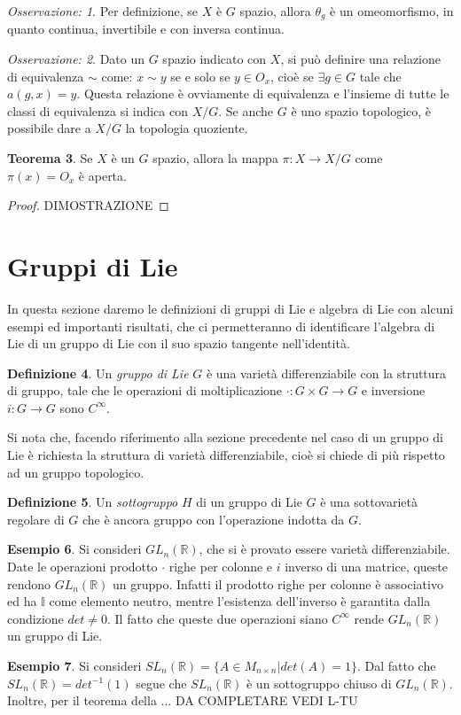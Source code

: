 \documentclass[12pt,a4paper]{report}
\theoremstyle{definition}
\newtheorem{Def}{Definizione}[chapter]
\newtheorem{Theo}[Def]{Teorema}
\theoremstyle{definition}
\newtheorem{Ex}[Def]{Esempio}
\theoremstyle{definition}
\theoremstyle{remark}
\newtheorem{Obs}[Def]{Osservazione:}
\begin{document}
\begin{Obs}
	Per definizione, se $X$ è $G$ spazio, allora $\theta_g$ è un omeomorfismo, in quanto continua, invertibile e con inversa continua.
\end{Obs}
\begin{Obs}
	Dato un $G$ spazio indicato con $X$, si può definire una relazione di equivalenza $\sim$ come: $x\sim y$ se e solo se $y\in O_x$, cioè se $\exists g\in G$ tale che $a(g,x)=y$. Questa relazione è ovviamente di equivalenza e l'insieme di tutte le classi di equivalenza si indica con $X/G$. Se anche $G$ è uno spazio topologico, è possibile dare a $X/G$ la topologia quoziente.   
\end{Obs}
\begin{Theo}
	Se $X$ è un $G$ spazio, allora la mappa $\pi:X\rightarrow X/G$ come $\pi(x)=O_x$ è aperta.
\end{Theo}
\begin{proof}
	DIMOSTRAZIONE
\end{proof}
\section{Gruppi di Lie}
In questa sezione daremo le definizioni di gruppi di Lie e algebra di Lie con alcuni esempi ed importanti risultati, che ci permetteranno di identificare l'algebra di Lie di un gruppo di Lie con il suo spazio tangente nell'identità.
\begin{Def}
	Un \textit{gruppo di Lie} $G$ è una varietà differenziabile con la struttura di gruppo, tale che le operazioni di moltiplicazione $\cdot:G\times G\rightarrow G$ e inversione $i:G\rightarrow G$ sono $C^\infty$.
\end{Def}
Si nota che, facendo riferimento alla sezione precedente nel caso di un gruppo di Lie è richiesta la struttura di varietà differenziabile, cioè si chiede di più rispetto ad un gruppo topologico.
\begin{Def}
	Un \textit{sottogruppo} $H$ di un gruppo di Lie $G$ è una sottovarietà regolare di $G$ che è ancora gruppo con l'operazione indotta da $G$.
\end{Def}
\begin{Ex}
	Si consideri $GL_n(\mathbb{R})$, che si è provato essere varietà differenziabile. Date le operazioni prodotto $\cdot$ righe per colonne e $i$ inverso di una matrice, queste rendono $GL_n(\mathbb{R})$ un gruppo. Infatti il prodotto righe per colonne è associativo ed ha $\mathbb{I}$ come elemento neutro, mentre l'esistenza dell'inverso è garantita dalla condizione $det\neq 0$. Il fatto che queste due operazioni siano $C^\infty$ rende $GL_n(\mathbb{R})$ un gruppo di Lie.
\end{Ex}
\begin{Ex}
	Si consideri $SL_n(\mathbb{R})=\{A\in M_{n\times n}| det(A)=1\}$. Dal fatto che $SL_n(\mathbb{R})=det^{-1}(1)$ segue che $SL_n(\mathbb{R})$ è un sottogruppo chiuso di $GL_n(\mathbb{R})$. Inoltre, per il teorema della ... DA COMPLETARE VEDI L-TU
\end{Ex}
\end{document}

